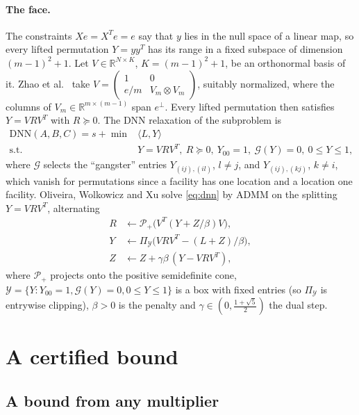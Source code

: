 \documentclass[11pt]{article}
\theoremstyle{remark}
\newcommand{\R}{\mathbb{R}}
\newcommand{\inner}[2]{\langle #1, #2\rangle}
\newcommand{\Pspd}{\mathcal{P}_{+}}
\newcommand{\DNN}{\mathrm{DNN}}
\begin{document}
\paragraph{The face.} The constraints $Xe = X^Te = e$ say that $y$ lies in the null
space of a linear map, so every lifted permutation $Y = yy^T$ has its range in a
fixed subspace of dimension $(m-1)^2+1$. Let $V \in\R^{N\times K}$, $K = (m-1)^2+1$,
be an orthonormal basis of it. Zhao et al.\ \cite{zkrw} take
$V = \begin{pmatrix}1 & 0\\ e/m & V_m\otimes V_m\end{pmatrix}$, suitably normalized,
where the columns of $V_m\in\R^{m\times(m-1)}$ span $e^\perp$. Every lifted
permutation then satisfies $Y = VRV^T$ with $R \succeq 0$. The DNN relaxation of the
subproblem is
\begin{equation}\label{eq:dnn}
  \begin{array}{rl}
  \DNN(A,B,C) = s + \min & \inner{L}{Y}\\
  \text{s.t.} & Y = VRV^T,\ R\succeq 0,\ Y_{00}=1,\ \mathcal{G}(Y) = 0,\ 0 \le Y \le 1,
  \end{array}
\end{equation}
where $\mathcal{G}$ selects the ``gangster'' entries $Y_{(ij),(il)}$, $l\ne j$, and
$Y_{(ij),(kj)}$, $k\ne i$, which vanish for permutations since a facility has one
location and a location one facility. Oliveira, Wolkowicz and Xu \cite{owx} solve
\eqref{eq:dnn} by ADMM on the splitting $Y = VRV^T$, alternating
\begin{align}
  R &\leftarrow \Pspd\big(V^T(Y + Z/\beta)V\big), \label{eq:rstep}\\
  Y &\leftarrow \Pi_{\mathcal{Y}}\big(VRV^T - (L + Z)/\beta\big), \label{eq:ystep}\\
  Z &\leftarrow Z + \gamma\beta\,(Y - VRV^T), \label{eq:zstep}
\end{align}
where $\Pspd$ projects onto the positive semidefinite cone,
$\mathcal{Y} = \{Y: Y_{00}=1, \mathcal{G}(Y)=0, 0\le Y\le1\}$ is a box with fixed
entries (so $\Pi_{\mathcal{Y}}$ is entrywise clipping), $\beta>0$ is the penalty
and $\gamma\in(0,\frac{1+\sqrt5}{2})$ the dual step.

\section{A certified bound}\label{sec:cert0}

\subsection{A bound from any multiplier}\label{sec:cert}
\end{document}
